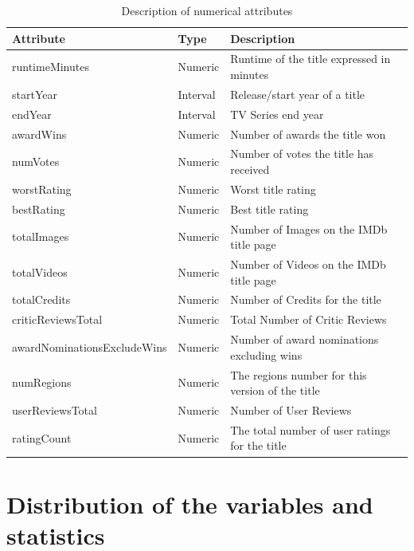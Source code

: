 \begin{table}[h]
    \centering
    \begin{tabular}{|l|l|l|} %
        \hline
        \textbf{Attribute} & \textbf{Type} & \textbf{Description} \\ 
        \hline
        runtimeMinutes & Numeric & Runtime of the title expressed in minutes \\ 
        \hline
        startYear & Interval & Release/start year of a title \\ 
        \hline
        endYear & Interval & TV Series end year \\
        \hline
        awardWins & Numeric & Number of awards the title won \\ 
        \hline
        numVotes & Numeric & Number of votes the title has received \\ 
        \hline
        worstRating & Numeric & Worst title rating \\ 
        \hline
        bestRating & Numeric & Best title rating \\ 
        \hline
        totalImages & Numeric & Number of Images on the IMDb title page \\ 
        \hline
        totalVideos & Numeric & Number of Videos on the IMDb title page \\ 
        \hline
        totalCredits & Numeric & Number of Credits for the title \\ 
        \hline
        criticReviewsTotal & Numeric & Total Number of Critic Reviews \\ 
        \hline
        awardNominationsExcludeWins & Numeric & Number of award nominations excluding wins \\ 
        \hline
        numRegions & Numeric & The regions number for this version of the title \\ 
        \hline
        userReviewsTotal & Numeric & Number of User Reviews \\ 
        \hline
        ratingCount & Numeric & The total number of user ratings for the title \\ 
        \hline
    \end{tabular}
    \caption{Description of numerical attributes}
    \label{tab:numerical_attributes}
\end{table}
\section{Distribution of the variables and statistics}\label{sec:variable_distrib}
